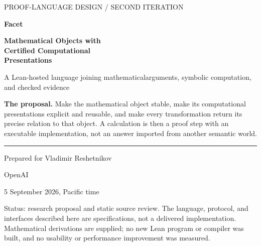 \documentclass[11pt,letterpaper]{article}
\numberwithin{equation}{section}
\begin{document}
\begin{titlepage}
\color{ink}
{\sffamily\large PROOF-LANGUAGE DESIGN / SECOND ITERATION\par}
\vspace*{1.0in}
{\sffamily\bfseries\fontsize{39}{44}\selectfont Facet\par}
\vspace{.24in}
{\sffamily\bfseries\fontsize{25}{31}\selectfont Mathematical Objects with\\Certified Computational\\Presentations\par}
\vspace{.3in}
{\sffamily\Large A Lean-hosted language joining mathematical\newline arguments, symbolic computation, and checked evidence\par}
\vspace{.45in}
\begin{claimbox}
\color{black}
\textbf{The proposal.} Make the mathematical object stable, make its computational
presentations explicit and reusable, and make every transformation return its
precise relation to that object. A calculation is then a proof step with an
executable implementation, not an answer imported from another semantic world.
\end{claimbox}
\vfill
\rule{\textwidth}{.7pt}
Prepared for Vladimir Reshetnikov\par
OpenAI\par
5 September 2026, Pacific time\par
\vspace{.15in}
{\small\color{black}Status: research proposal and static source review. The language,
protocol, and interfaces described here are specifications, not a delivered
implementation. Mathematical derivations are supplied; no new Lean program or
compiler was built, and no usability or performance improvement was measured.}
\end{titlepage}
\end{document}
